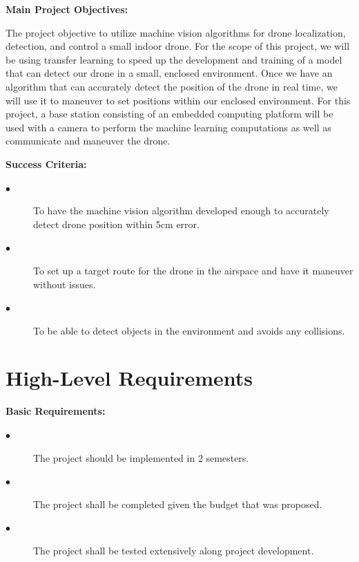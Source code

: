 \documentclass[12pt,onecolumn]{IEEEtran}			%
\begin{document}
 
 \textbf{Main Project Objectives:}

The project objective to utilize machine vision algorithms for drone localization, detection, and control a small indoor drone. For the scope of this project, we will be using transfer learning to speed up the development and training of a model that can detect our drone in a small, enclosed environment. Once we have an algorithm that can accurately detect the position of the drone in real time, we will use it to maneuver to set positions within our enclosed environment. For this project, a base station consisting of an embedded computing platform will be used with a camera to perform the machine learning computations as well as communicate and maneuver the drone.
  




\vspace{12pt} 

 \textbf{Success Criteria:}

 \begin{description}
  \item[$\bullet$ ] To have the machine vision algorithm developed enough to accurately detect drone position within 5cm error. 
  \item[$\bullet$ ] To set up a target route for the drone in the airspace and have it maneuver without issues. 
  \item[$\bullet$ ] To be able to detect objects in the environment and avoids any collisions. 
\end{description} 
\vspace{12pt} 


 
 \section{High-Level Requirements}

 
\textbf{Basic Requirements:}

 \begin{description}
  \item[$\bullet$ ] The project should be implemented in 2 semesters. 
  \item[$\bullet$ ] The project shall be completed given the budget that was proposed. 
  \item[$\bullet$ ] The project shall be tested extensively along project development. 
  
\end{description} 
\end{document}
